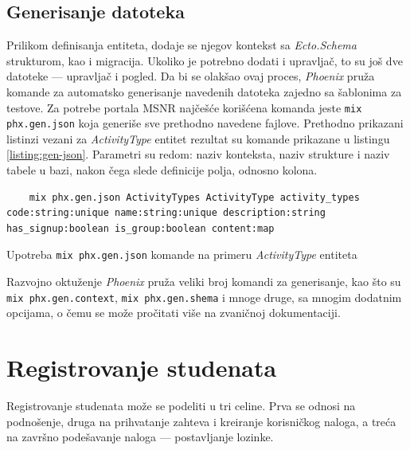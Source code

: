 \documentclass[12pt,oneside]{memoir}
\begin{document}
\subsection{Generisanje datoteka}
Prilikom definisanja entiteta, dodaje se njegov kontekst sa \emph{Ecto.Schema} strukturom, kao i migracija. 
Ukoliko je potrebno dodati i upravljač, to su još dve datoteke --- upravljač i pogled. Da bi se olakšao ovaj
proces, \emph{Phoenix} pruža komande za automatsko generisanje navedenih datoteka zajedno sa šablonima za testove.
Za potrebe portala MSNR najčešće korišćena komanda jeste \texttt{mix phx.gen.json} koja generiše sve prethodno
navedene fajlove. Prethodno prikazani listinzi vezani za \emph{ActivityType} entitet rezultat su komande prikazane u
listingu \ref{listing:gen-json}. Parametri su redom: naziv konteksta, naziv strukture i naziv tabele u bazi, nakon čega slede
definicije polja, odnosno kolona.
\begin{listing}[h]
  \begin{verbatim}
    mix phx.gen.json ActivityTypes ActivityType activity_types code:string:unique name:string:unique description:string has_signup:boolean is_group:boolean content:map
  \end{verbatim}
\caption{Upotreba \texttt{mix phx.gen.json} komande na primeru \emph{ActivityType} entiteta}
\label{listing:gen-json}
\end{listing}
Razvojno oktuženje \emph{Phoenix} pruža veliki broj komandi za generisanje, kao što su \texttt{mix phx.gen.context}, 
\texttt{mix phx.gen.shema} i mnoge druge, sa mnogim dodatnim opcijama, o čemu se može pročitati više na zvaničnoj dokumentaciji.

\section{Registrovanje studenata}
Registrovanje studenata može se podeliti u tri celine. Prva se odnosi na podnošenje, druga na prihvatanje
zahteva i kreiranje korisničkog naloga, a treća na završno podešavanje naloga --- postavljanje lozinke.
\end{document}
